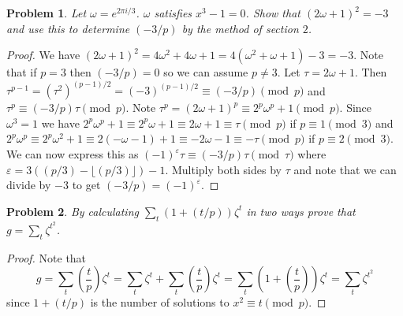 \documentclass{article}
\newtheorem{problem}{Problem}
\begin{document}
\begin{problem}
Let $\omega = e^{2 \pi i/3}$. $\omega$ satisfies $x^3 - 1 = 0$. Show that $(2 \omega + 1)^2 = -3$ and use this to determine $(-3/p)$ by the method of section $2$.
\end{problem}
\begin{proof}
We have $(2 \omega + 1)^2 = 4 \omega^2 + 4 \omega + 1 = 4(\omega^2 + \omega + 1) - 3 = -3$. Note that if $p = 3$ then $(-3/p) = 0$ so we can assume $p \neq 3$. Let $\tau = 2 \omega + 1$. Then $\tau^{p-1} = (\tau^2)^{(p-1)/2} = (-3)^{(p-1)/2} \equiv (-3/p) \pmod{p}$ and $\tau^p \equiv (-3/p) \tau \pmod{p}$. Note $\tau^p = (2 \omega + 1)^p \equiv 2^p \omega^p + 1 \pmod{p}$. Since $\omega^3 = 1$ we have $2^p \omega^p + 1 \equiv 2^p \omega + 1 \equiv 2 \omega + 1 \equiv \tau \pmod{p}$ if $p \equiv 1 \pmod{3}$ and $2^p \omega^p \equiv 2^p \omega^2 + 1 \equiv 2 (-\omega - 1) + 1 \equiv -2 \omega - 1 \equiv -\tau \pmod{p}$ if $p \equiv 2 \pmod{3}$. We can now express this as $(-1)^{\varepsilon} \tau \equiv (-3/p) \tau \pmod{\tau}$ where $\varepsilon = 3((p/3) - \lfloor (p/3) \rfloor)-1$. Multiply both sides by $\tau$ and note that we can divide by $-3$ to get $(-3/p) = (-1)^{\varepsilon}$.
\end{proof}

\begin{problem}
By calculating $\sum_t (1 + (t/p)) \zeta^t$ in two ways prove that $g = \sum_t \zeta^{t^2}$.
\end{problem}
\begin{proof}
Note that
\[
g = \sum_t \left ( \frac{t}{p} \right ) \zeta^t = \sum_t \zeta^t + \sum_t \left ( \frac{t}{p} \right ) \zeta^t = \sum_t \left ( 1 + \left ( \frac{t}{p} \right ) \right ) \zeta^t = \sum_t \zeta^{t^2}
\]
since $1 + (t/p)$ is the number of solutions to $x^2 \equiv t \pmod{p}$.
\end{proof}
\end{document}
